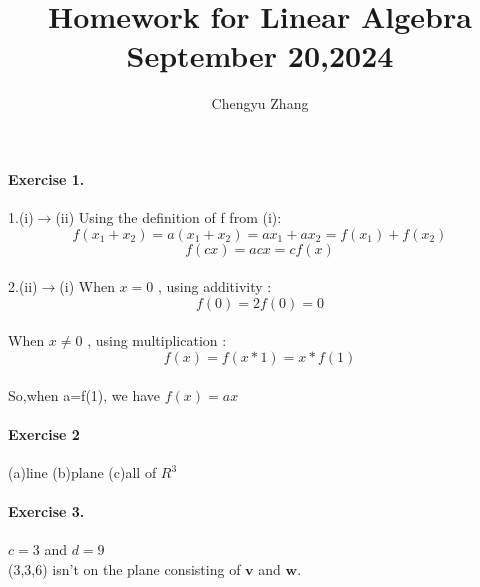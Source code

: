 \documentclass{article}
\title{\vspace{-3.5cm}Homework for Linear Algebra\\September 20,2024}
\author{Chengyu Zhang}
\date{}
\begin{document}
\maketitle
\paragraph{Exercise 1.}
1.(i)$\rightarrow$(ii) Using the definition of f from (i):
\[
f(x_1+x_2)=a(x_1+x_2)=ax_1+ax_2=f(x_1)+f(x_2)
\]
\[f(cx)=acx=cf(x)\]
\\2.(ii)$\rightarrow$(i) When $x=0$ , using additivity : \[f(0)=2f(0)=0\]\\
When $x \neq 0$ , using multiplication : \[f(x)=f(x*1)=x*f(1)\]\\
So,when a=f(1), we have $f(x)=ax$

\paragraph{Exercise 2}
(a)line (b)plane  (c)all of $R^3$


\paragraph{Exercise 3.} $c=3$ and $d = 9$\\
(3,3,6) isn't on the plane consisting of $\boldsymbol{v}$ and $\boldsymbol{w}$.
\end{document}
